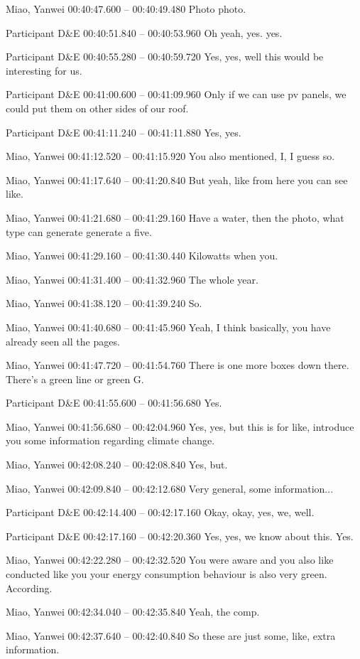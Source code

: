 {Miao, Yanwei 00:40:47.600 -- 00:40:49.480
Photo photo.

Participant D\&E 00:40:51.840 -- 00:40:53.960
Oh yeah, yes. yes.

Participant D\&E 00:40:55.280 -- 00:40:59.720
Yes, yes, well this would be interesting for us.

Participant D\&E 00:41:00.600 -- 00:41:09.960
Only if we can use pv panels, we could put them on other sides of our roof.

Participant D\&E 00:41:11.240 -- 00:41:11.880
Yes, yes.

Miao, Yanwei 00:41:12.520 -- 00:41:15.920
You also mentioned, I, I guess so.

Miao, Yanwei 00:41:17.640 -- 00:41:20.840
But yeah, like from here you can see like.

Miao, Yanwei 00:41:21.680 -- 00:41:29.160
Have a water, then the photo, what type can generate generate a five.

Miao, Yanwei 00:41:29.160 -- 00:41:30.440
Kilowatts when you.

Miao, Yanwei 00:41:31.400 -- 00:41:32.960
The whole year.

Miao, Yanwei 00:41:38.120 -- 00:41:39.240
So.

Miao, Yanwei 00:41:40.680 -- 00:41:45.960
Yeah, I think basically, you have already seen all the pages.

Miao, Yanwei 00:41:47.720 -- 00:41:54.760
There is one more boxes down there. There's a green line or green G.

Participant D\&E 00:41:55.600 -- 00:41:56.680
Yes.

Miao, Yanwei 00:41:56.680 -- 00:42:04.960
Yes, yes, but this is for like, introduce you some information regarding climate change.

Miao, Yanwei 00:42:08.240 -- 00:42:08.840
Yes, but.

Miao, Yanwei 00:42:09.840 -- 00:42:12.680
Very general, some information...

Participant D\&E 00:42:14.400 -- 00:42:17.160
Okay, okay, yes, we, well.

Participant D\&E 00:42:17.160 -- 00:42:20.360
Yes, yes, we know about this. Yes.

Miao, Yanwei 00:42:22.280 -- 00:42:32.520
You were aware and you also like conducted like you your energy consumption behaviour is also very green. According.

Miao, Yanwei 00:42:34.040 -- 00:42:35.840
Yeah, the comp.

Miao, Yanwei 00:42:37.640 -- 00:42:40.840
So these are just some, like, extra information.

}
